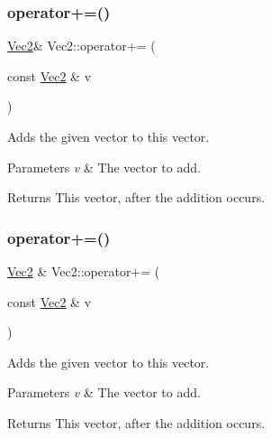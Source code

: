 \subsubsection{\texorpdfstring{operator+=()}{operator+=()}\hspace{0.1cm}{\footnotesize\ttfamily [1/2]}}
{\footnotesize\ttfamily \hyperlink{classVec2}{Vec2}\& Vec2\+::operator+= (\begin{DoxyParamCaption}\item[{const \hyperlink{classVec2}{Vec2} \&}]{v }\end{DoxyParamCaption})\hspace{0.3cm}{\ttfamily [inline]}}

Adds the given vector to this vector.


\begin{DoxyParams}{Parameters}
{\em v} & The vector to add. \\
\hline
\end{DoxyParams}
\begin{DoxyReturn}{Returns}
This vector, after the addition occurs. 
\end{DoxyReturn}
\mbox{\label{classVec2_ae19f0fad92bf57a440b0367a1a71acd2}} 
\subsubsection{\texorpdfstring{operator+=()}{operator+=()}\hspace{0.1cm}{\footnotesize\ttfamily [2/2]}}
{\footnotesize\ttfamily \hyperlink{classVec2}{Vec2} \& Vec2\+::operator+= (\begin{DoxyParamCaption}\item[{const \hyperlink{classVec2}{Vec2} \&}]{v }\end{DoxyParamCaption})\hspace{0.3cm}{\ttfamily [inline]}}

Adds the given vector to this vector.


\begin{DoxyParams}{Parameters}
{\em v} & The vector to add. \\
\hline
\end{DoxyParams}
\begin{DoxyReturn}{Returns}
This vector, after the addition occurs. 
\end{DoxyReturn}
\mbox{\label{classVec2_afea5a75f39e0db3d893aa56f11e90a60}} 
